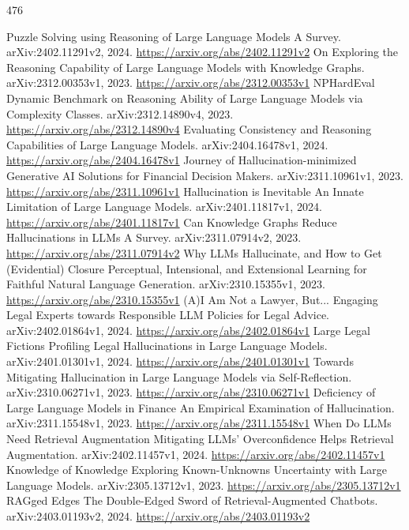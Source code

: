\documentclass[11pt]{article}
\begin{document}
\begin{thebibliography}{476}
 Puzzle Solving using Reasoning of Large Language Models A Survey. arXiv:2402.11291v2, 2024. \url{https://arxiv.org/abs/2402.11291v2}
 On Exploring the Reasoning Capability of Large Language Models with Knowledge Graphs. arXiv:2312.00353v1, 2023. \url{https://arxiv.org/abs/2312.00353v1}
 NPHardEval Dynamic Benchmark on Reasoning Ability of Large Language Models via Complexity Classes. arXiv:2312.14890v4, 2023. \url{https://arxiv.org/abs/2312.14890v4}
 Evaluating Consistency and Reasoning Capabilities of Large Language Models. arXiv:2404.16478v1, 2024. \url{https://arxiv.org/abs/2404.16478v1}
 Journey of Hallucination-minimized Generative AI Solutions for Financial Decision Makers. arXiv:2311.10961v1, 2023. \url{https://arxiv.org/abs/2311.10961v1}
 Hallucination is Inevitable An Innate Limitation of Large Language Models. arXiv:2401.11817v1, 2024. \url{https://arxiv.org/abs/2401.11817v1}
 Can Knowledge Graphs Reduce Hallucinations in LLMs A Survey. arXiv:2311.07914v2, 2023. \url{https://arxiv.org/abs/2311.07914v2}
 Why LLMs Hallucinate, and How to Get (Evidential) Closure Perceptual, Intensional, and Extensional Learning for Faithful Natural Language Generation. arXiv:2310.15355v1, 2023. \url{https://arxiv.org/abs/2310.15355v1}
 (A)I Am Not a Lawyer, But... Engaging Legal Experts towards Responsible LLM Policies for Legal Advice. arXiv:2402.01864v1, 2024. \url{https://arxiv.org/abs/2402.01864v1}
 Large Legal Fictions Profiling Legal Hallucinations in Large Language Models. arXiv:2401.01301v1, 2024. \url{https://arxiv.org/abs/2401.01301v1}
 Towards Mitigating Hallucination in Large Language Models via Self-Reflection. arXiv:2310.06271v1, 2023. \url{https://arxiv.org/abs/2310.06271v1}
 Deficiency of Large Language Models in Finance An Empirical Examination of Hallucination. arXiv:2311.15548v1, 2023. \url{https://arxiv.org/abs/2311.15548v1}
 When Do LLMs Need Retrieval Augmentation Mitigating LLMs' Overconfidence Helps Retrieval Augmentation. arXiv:2402.11457v1, 2024. \url{https://arxiv.org/abs/2402.11457v1}
 Knowledge of Knowledge Exploring Known-Unknowns Uncertainty with Large Language Models. arXiv:2305.13712v1, 2023. \url{https://arxiv.org/abs/2305.13712v1}
 RAGged Edges The Double-Edged Sword of Retrieval-Augmented Chatbots. arXiv:2403.01193v2, 2024. \url{https://arxiv.org/abs/2403.01193v2}

\end{thebibliography}
\end{document}
